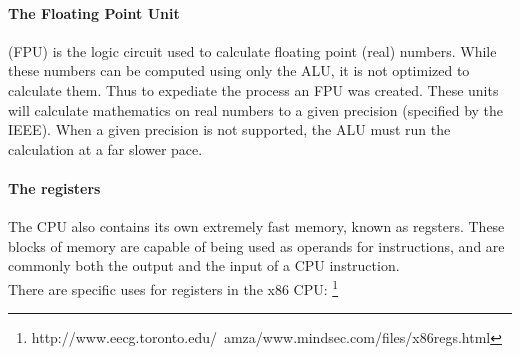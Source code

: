 \documentclass[a4paper,11pt]{book}
\begin{document}
				\paragraph{The Floating Point Unit}
					(FPU) is the logic circuit used to calculate floating point (real) numbers. 
					While these numbers can be computed using only the ALU, it is not optimized to calculate them.
					Thus to expediate the process an FPU was created. 
					These units will calculate mathematics on real numbers to a given precision (specified by the IEEE). %
					When a given precision is not supported, the ALU must run the calculation at a far slower pace. 
				\paragraph{The registers}
					The CPU also contains its own extremely fast memory, known as regsters. 
					These blocks of memory are capable of being used as operands for instructions, and are commonly both the output and the input of a CPU instruction.\\ 
					There are specific uses for registers in the x86 CPU: \footnote{http://www.eecg.toronto.edu/~amza/www.mindsec.com/files/x86regs.html}
\end{document}
